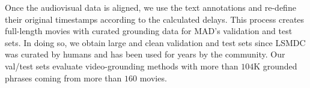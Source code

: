 \documentclass[10pt,twocolumn,letterpaper]{article}
\begin{document}
Once the audiovisual data is aligned, we use the text annotations and re-define their original timestamps according to the calculated delays. This process creates full-length movies with curated grounding data for MAD's validation and test sets. In doing so, we obtain large and clean validation and test sets since LSMDC was curated by humans and has been used for years by the community. Our val/test sets evaluate video-grounding methods with more than $104$K grounded phrases coming from more than $160$ movies. 

\begin{table*}[!ht]
    \centering
\setlength{\tabcolsep}{2.5pt}
\renewcommand{\arraystretch}{1} 
\end{table*}
\end{document}
